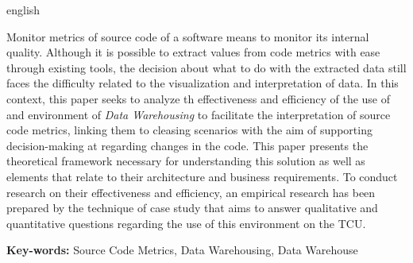 \begin{resumo}[Abstract]
 \begin{otherlanguage*}{english}

Monitor metrics of source code of a software means to monitor its internal quality. Although it is possible to extract values from code metrics with ease through existing tools, the decision about what to do with the extracted data still faces the difficulty related to the visualization and interpretation of data. In this context, this paper seeks to analyze th effectiveness and efficiency of the use of and environment of \textit{Data Warehousing} to facilitate the interpretation of source code metrics, linking them to cleasing scenarios with the aim of supporting decision-making at regarding changes in the code. This paper presents the theoretical framework necessary for understanding this solution as well as elements that relate to their architecture and business requirements. To conduct research on their effectiveness and efficiency, an empirical research has been prepared by the technique of case study that aims to answer qualitative and quantitative questions regarding the use of this environment on the TCU.
 
\textbf{Key-words:} Source Code Metrics,  Data Warehousing, Data Warehouse

 \end{otherlanguage*}
\end{resumo}



 		